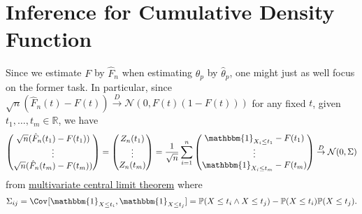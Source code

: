 \section{Inference for Cumulative Density Function}
Since we estimate \(F\) by \(\hat{F} _n\) when estimating \(\theta _p\) by \(\hat{\theta} _p\), one might just as well focus on the former task. In particular, since \(\sqrt{n} (\hat{F} _n(t) - F(t)) \overset{D}{\to} \mathcal{N} (0, F(t) (1 - F(t)))\) for any fixed \(t\), given \(t_1, \dots , t_m \in \mathbb{R} \), we have
\[
	\begin{pmatrix}
		\sqrt{n} (\hat{F} _n(t_1) - F(t_1)) \\
		\vdots                              \\
		\sqrt{n} (\hat{F} _n(t_m) - F(t_m)) \\
	\end{pmatrix}
	= \begin{pmatrix}
		Z_n(t_1) \\
		\vdots   \\
		Z_n(t_m) \\
	\end{pmatrix}
	= \frac{1}{\sqrt{n} } \sum_{i=1}^{n} \begin{pmatrix}
		\mathbbm{1}_{X_i \leq t_1} - F(t_1) \\
		\vdots                              \\
		\mathbbm{1}_{X_i \leq t_m} - F(t_m) \\
	\end{pmatrix}
	\overset{D}{\to} \mathcal{N} (0, \Sigma )
\]
from \hyperref[thm:multivariate-CLT]{multivariate central limit theorem} where
\[
	\Sigma _{ij} = \Cov_{}[\mathbbm{1}_{X \leq t_i} , \mathbbm{1}_{X \leq t_j} ] = \mathbb{P} (X \leq t_i \land X \leq t_j) - \mathbb{P} (X \leq t_i) \mathbb{P} (X \leq t_j).
\]